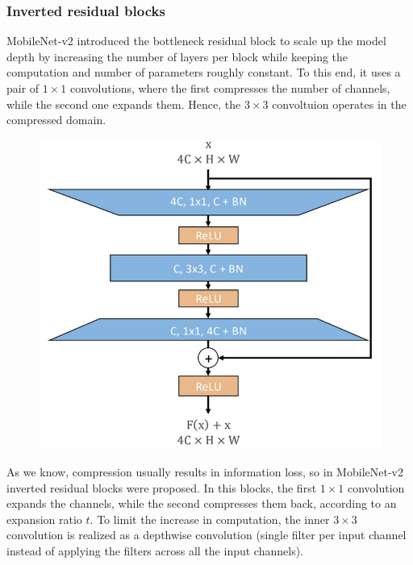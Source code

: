 \subsubsection{Inverted residual blocks}
MobileNet-v2 introduced the bottleneck residual block to scale up the model depth by increasing the number of layers per block while keeping the computation and number of parameters roughly constant.
To this end, it uses a pair of $1\times 1$ convolutions, where the first compresses the number of channels, while the second one expands them.
Hence, the $3\times 3$ convoltuion operates in the compressed domain.

\begin{figure}[htbp]
  \centering
  \includegraphics[width=0.8\linewidth]{./img/bottleneck_residual.jpg}
\end{figure}

As we know, compression usually results in information loss, so in MobileNet-v2 inverted residual blocks were proposed.
In this blocks, the first $1\times 1$ convolution expands the channels, while the second compresses them back, according to an expansion ratio $t$.
To limit the increase in computation, the inner $3\times 3$ convolution is realized as a depthwise convolution (single filter per input channel instead of applying the filters across all the input channels).

